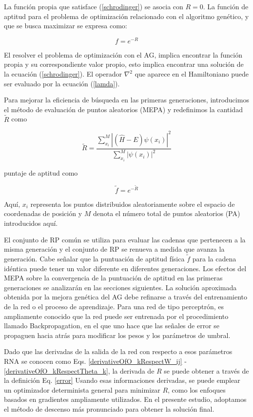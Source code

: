 La funci\'on propia que satisface (\ref{schrodinger}) se asocia con $R=0$.
La funci\'on de aptitud para el problema de optimizaci\'on relacionado
con el algoritmo gen\'etico, y que se busca maximizar se expresa como:

\begin{equation}
	f=e^{-R}
\end{equation}

El resolver el problema de optimizaci\'on con el AG,
implica encontrar la funci\'on propia y su correspondiente valor
propio, esto implica encontrar una soluci\'on de la ecuaci\'on
(\ref{schrodinger}). El operador $\nabla^2$ que aparece en el Hamiltoniano puede
ser evaluado por la ecuaci\'on (\ref{lamda}).

Para mejorar la eficiencia de b\'usqueda en las primeras generaciones,
introducimos el m\'etodo de evaluaci\'on de puntos aleatorios (MEPA) y
redefinimos la cantidad $\tilde{R}$ como

\begin{equation}
	\tilde{R}=\frac{ \sum^{M}_{x_i} \left| \left(\hat{H}-E\right) \psi \left(x_i\right) \right| ^2 }{ \sum^{M}_{x_i} \left| \psi(x_i) \right| ^2 }
	\label{rpemEquation}
\end{equation}

puntaje de aptitud como

\begin{equation}
	\tilde{f}=e^{-\tilde{R}}
	\label{fitnessScoreEquation}
\end{equation}

Aqu\'i, $x_i$ representa los puntos distribuidos aleatoriamente sobre
el espacio de coordenadas de posici\'on y $M$ denota el n\'umero total de
puntos aleatorios (PA) introducidos aqu\'i.

El conjunto de RP com\'un se utiliza para evaluar las cadenas que pertenecen
a la misma generaci\'on y el conjunto de RP se renueva a medida que avanza la
generaci\'on. Cabe se\~nalar que la puntuaci\'on de aptitud f\'isica $\tilde{f}$ para la
cadena id\'entica puede tener un valor diferente en diferentes generaciones.
Los efectos del MEPA sobre la convergencia de la puntuaci\'on de aptitud en las primeras
generaciones se analizar\'an en las secciones siguientes. La soluci\'on aproximada obtenida
por la mejora gen\'etica del AG debe refinarse a trav\'es del entrenamiento de
la red o el proceso de aprendizaje. Para una red de tipo perceptr\'on, es
ampliamente conocido que la red puede ser entrenada por el procedimiento
llamado Backpropagation, en el que uno hace que las se\~nales de error
se propaguen hacia atr\'as para modificar los pesos y los par\'ametros de umbral.

Dado que las derivadas de la salida de la red con respecto a esos par\'ametros
RNA se conocen como Eqs. \ref{derivativeOfO_kRespectW_ij} - \ref{derivativeOfO_kRespectTheta_k},
la derivada de $R$ se puede obtener a trav\'es de la definici\'on Eq. \ref{error}
Usando esas informaciones derivadas, se puede emplear un optimizador determinista
general para minimizar $R$, como los enfoques basados en gradientes ampliamente
utilizados. En el presente estudio, adoptamos el m\'etodo de descenso m\'as
pronunciado para obtener la soluci\'on final.